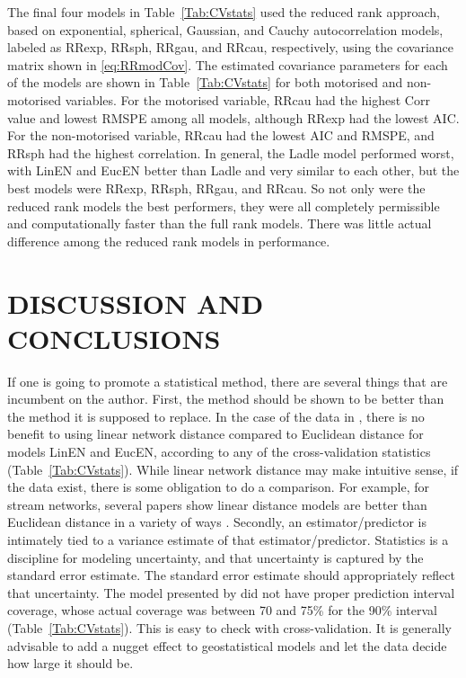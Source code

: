\documentclass[11pt, titlepage]{article}\usepackage[]{graphicx}\usepackage[]{color}
\begin{document}
\begin{spacing}{1.9}
\begin{flushleft}
The final four models in Table~\ref{Tab:CVstats} used the reduced rank approach, based on exponential, spherical, Gaussian, and Cauchy autocorrelation models, labeled as RRexp, RRsph, RRgau, and RRcau, respectively, using the covariance matrix shown in \ref{eq:RRmodCov}.  The estimated covariance parameters for each of the models are shown in Table~\ref{Tab:CVstats} for both motorised and non-motorised variables.  For the motorised variable, RRcau had the highest Corr value and lowest RMSPE among all models, although RRexp had the lowest AIC. For the non-motorised variable, RRcau had the lowest AIC and RMSPE, and RRsph had the highest correlation.  In general, the Ladle model performed worst, with LinEN and EucEN better than Ladle and very similar to each other, but the best models were RRexp, RRsph, RRgau, and RRcau.  So not only were the reduced rank models the best performers, they were all completely permissible and computationally faster than the full rank models.  There was little actual difference among the reduced rank models in performance.

\section*{DISCUSSION AND CONCLUSIONS}

If one is going to promote a statistical method, there are several things that are incumbent on the author.  First, the method should be shown to be better than the method it is supposed to replace.  In the case of the data in \citet{Ladl:Avga:Whea:Boyc:pred:2016}, there is no benefit to using linear network distance compared to Euclidean distance for models LinEN and EucEN, according to any of the cross-validation statistics (Table~\ref{Tab:CVstats}).  While linear network distance may make intuitive sense, if the data exist, there is some obligation to do a comparison.  For example, for stream networks, several papers show linear distance models are better than Euclidean distance in a variety of ways \citep{Pete:Ver:Isaa:stre:2013,Isaa:Pete:Ver:Weng:Appl:2014,Rush:Pete:Ver:Bowm:2015}.  Secondly, an estimator/predictor is intimately tied to a variance estimate of that estimator/predictor.  Statistics is a discipline for modeling uncertainty, and that uncertainty is captured by the standard error estimate.  The standard error estimate should appropriately reflect that uncertainty.  The model presented by \citet{Ladl:Avga:Whea:Boyc:pred:2016} did not have proper prediction interval coverage, whose actual coverage was between 70 and 75\% for the 90\% interval (Table~\ref{Tab:CVstats}). This is easy to check with cross-validation.  It is generally advisable to add a nugget effect to geostatistical models and let the data decide how large it should be.


\end{flushleft}
\end{spacing}
\end{document}

